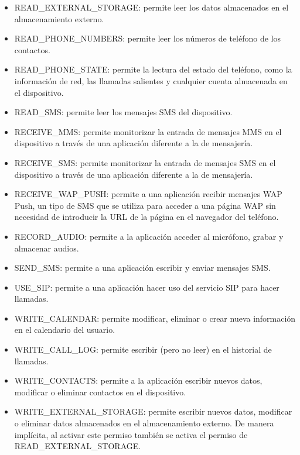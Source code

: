 \begin{itemize}
	\item READ\_EXTERNAL\_STORAGE: permite leer los datos almacenados en el almacenamiento externo.
	\item READ\_PHONE\_NUMBERS: permite leer los números de teléfono de los contactos.
	\item READ\_PHONE\_STATE: permite la lectura del estado del teléfono, como la información de red, las llamadas salientes y cualquier cuenta almacenada en el dispositivo.
	\item READ\_SMS: permite leer los mensajes SMS del dispositivo.
	\item RECEIVE\_MMS: permite monitorizar la entrada de mensajes MMS en el dispositivo a través de una aplicación diferente a la de mensajería.
	\item RECEIVE\_SMS: permite monitorizar la entrada de mensajes SMS en el dispositivo a través de una aplicación diferente a la de mensajería.
	\item RECEIVE\_WAP\_PUSH: permite a una aplicación recibir mensajes WAP Push, un tipo de SMS que se utiliza para acceder a una página WAP sin necesidad de introducir la URL de la página en el navegador del teléfono.
	\item RECORD\_AUDIO: permite a la aplicación acceder al micrófono, grabar y almacenar audios.
	\item SEND\_SMS: permite a una aplicación escribir y enviar mensajes SMS.
	\item USE\_SIP: permite a una aplicación hacer uso del servicio SIP para hacer llamadas.
	\item WRITE\_CALENDAR: permite modificar, eliminar o crear nueva información en el calendario del usuario.
	\item WRITE\_CALL\_LOG: permite escribir (pero no leer) en el historial de llamadas.
	\item WRITE\_CONTACTS: permite a la aplicación escribir nuevos datos, modificar o eliminar contactos en el dispositivo.
	\item WRITE\_EXTERNAL\_STORAGE: permite escribir nuevos datos, modificar o eliminar datos almacenados en el almacenamiento externo. De manera implícita, al activar este permiso también se activa el permiso de READ\_EXTERNAL\_STORAGE.
\end{itemize}